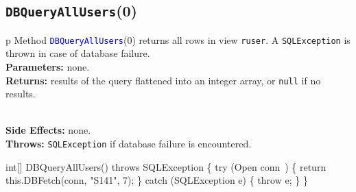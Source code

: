 \subsection{\texttt{DBQueryAllUsers}(0)}
\begin{tabular}{p{\textwidth}}
\toprule
{}
Method \textcolor{blue}{{\tt{}\protect{}DBQueryAllUsers}}(0) returns all rows in view {\tt{}r{}user}.
A {\tt{}SQLException} is thrown in case of database failure.\\
\midrule
\textbf{Parameters:} none.\\
\textbf{Returns:} results of the query flattened into an integer array, or
{\tt{}null} if no results.

\\
\textbf{Side Effects:} none.\\
\textbf{Throws:} {\tt{}SQLException} if database failure is encountered.\\
\bottomrule
\end{tabular}
\nwenddocs{}\endmoddef{}
int[] DBQueryAllUsers() throws SQLException \{
  try (\LA{}Open \code{}conn\edoc{}~{\nwtagstyle{}}\RA{}) \{
    return this.DBFetch(conn, "S141", 7);
  \} catch (SQLException e) \{
    throw e;
  \}
\}
\eatline
{}\nwendcode{}\nwdocspar
